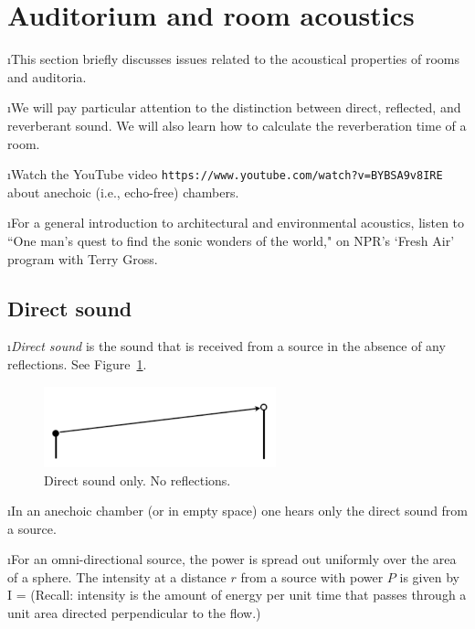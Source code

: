 \section{Auditorium and room acoustics}

\bi

\i This section briefly discusses issues related to the 
acoustical properties of rooms and auditoria.

\i We will pay particular attention to the distinction
between direct, reflected, and reverberant sound.
We will also learn how to calculate the reverberation
time of a room.

\i \demo Watch the YouTube video
{\tt https://www.youtube.com/watch?v=BYBSA9v8IRE}
about anechoic (i.e., echo-free) chambers.

\i \demo For a general introduction to architectural
and environmental acoustics, listen to 
``One man's quest to find the sonic wonders of the world,"
on NPR's `Fresh Air' program with Terry Gross.

\ei
\subsection{Direct sound}
\bi

\i {\em Direct sound} is the sound that is 
received from a source in the absence of any reflections.
See Figure~\ref{f:direct_sound}.
%
\begin{figure}[htbp]
\begin{center}
\includegraphics[width=0.6\textwidth]{reflection_0}
\caption{Direct sound only.
No reflections.}
\label{f:direct_sound}
\end{center}
\end{figure}
%

\i In an anechoic chamber (or in empty space) one 
hears only the direct sound from a source.

\i For an omni-directional source, the power is spread
out uniformly over the area of a sphere.
The intensity at a distance $r$ from a source with 
power $P$ is given by
%
\be
I = 
\ee
%
(Recall: intensity is the amount of energy per unit
time that passes through a unit area directed perpendicular
to the flow.)

